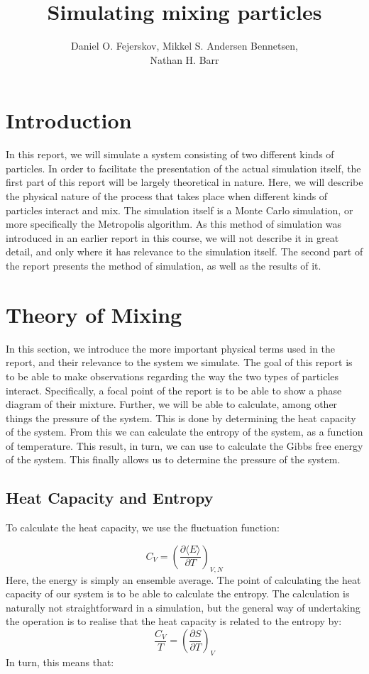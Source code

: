\documentclass[12pt,a4paper]{report}
\begin{document}
\title{Simulating mixing particles}
\author{Daniel O. Fejerskov, Mikkel S. Andersen Bennetsen,\\ Nathan H. Barr}
\maketitle
\tableofcontents

\chapter{Introduction}
In this report, we will simulate a system consisting of two different kinds of particles. In order to facilitate the presentation of the actual simulation itself, the first part of this report will be largely theoretical in nature. Here, we will describe the physical nature of the process that takes place when different kinds of particles interact and mix. The simulation itself is a Monte Carlo simulation, or more specifically the Metropolis algorithm. As this method of simulation was introduced in an earlier report in this course, we will not describe it in great detail, and only where it has relevance to the simulation itself. The second part of the report presents the method of simulation, as well as the results of it.

\chapter{Theory of Mixing}
In this section, we introduce the more important physical terms used in the report, and their relevance to the system we simulate. The goal of this report is to be able to make observations regarding the way the two types of particles interact. Specifically, a focal point of the report is to be able to show a phase diagram of their mixture. Further, we will be able to calculate, among other things the pressure of the system. This is done by determining the heat capacity of the system. From this we can calculate the entropy of the system, as a function of temperature. This result, in turn, we can use to calculate the Gibbs free energy of the system. This finally allows us to determine the pressure of the system.

\section{Heat Capacity and Entropy}
To calculate the heat capacity, we use the fluctuation function:

\begin{equation}\label{HeatC}
C_V = \left( \frac{\partial \langle E \rangle}{\partial T} \right)_{V,N}
\end{equation}
Here, the energy is simply an ensemble average. The point of calculating the heat capacity of our system is to be able to calculate the entropy. The calculation is naturally not straightforward in a simulation, but the general way of undertaking the operation is to realise that the heat capacity is related to the entropy by:
\begin{equation}
\frac{C_V}{T} = \left( \frac{\partial S}{\partial T}\right)_V
\end{equation}
In turn, this means that:
\end{document}
